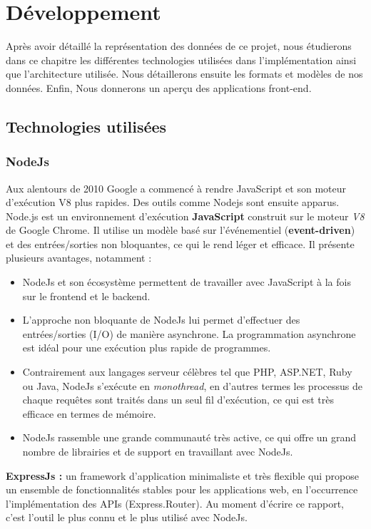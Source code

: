 \chapter{Développement}
Après avoir détaillé la représentation des données de ce projet, nous étudierons dans ce chapitre les différentes technologies utilisées dans l'implémentation ainsi que l'architecture utilisée. Nous détaillerons ensuite les formats et modèles de nos données. Enfin, Nous donnerons un aperçu des applications front-end.
\section{Technologies utilisées}
\subsection{NodeJs}
Aux alentours de 2010 Google a commencé à rendre JavaScript et son moteur d'exécution V8 plus rapides. Des outils comme Nodejs sont ensuite apparus\cite{NodeJs}.\newline
Node.js est un environnement d'exécution \textbf{JavaScript} construit sur le moteur \emph{V8} de Google Chrome. Il utilise un modèle basé sur l'événementiel (\textbf{event-driven}) et des entrées/sorties non bloquantes, ce qui le rend léger et efficace.
Il présente plusieurs avantages, notamment :
\begin{itemize}
	\item NodeJs et son écosystème permettent de travailler avec JavaScript à la fois sur le frontend et le backend.
	\item L'approche non bloquante de NodeJs lui permet d'effectuer des entrées/sorties (I/O) de manière asynchrone. La programmation asynchrone est idéal pour une exécution plus rapide de programmes.
	\item Contrairement aux langages serveur célèbres tel que PHP, ASP.NET, Ruby ou Java, NodeJs s'exécute en \emph{monothread}, en d'autres termes les processus de chaque requêtes sont traités dans un seul fil d'exécution, ce qui est très efficace en termes de mémoire.
	\item NodeJs rassemble une grande communauté très active, ce qui offre un grand nombre de librairies et de support en travaillant avec NodeJs.\newline
\end{itemize}

\textbf{ExpressJs :} un framework d'application minimaliste et très flexible qui propose un ensemble de fonctionnalités stables pour les applications web, en l'occurrence l'implémentation des APIs (Express.Router). Au moment d'écrire ce rapport, c'est l'outil le plus connu et le plus utilisé avec NodeJs.

